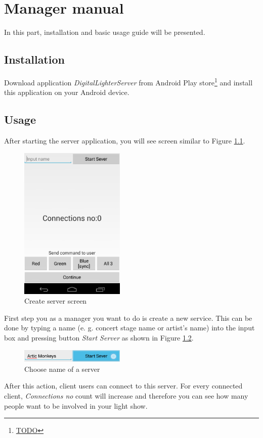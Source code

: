 \chapter{Manager manual}
In this part, installation and basic usage guide will be presented.
\section{Installation}
Download application \emph{DigitalLighterServer} from Android Play store\footnote{\url{TODO}} and install this application on your Android device.
\section{Usage}
After starting the server application, you will see screen similar to Figure \ref{fig:manual_server0}.
\begin{figure}[h]
	\centering
		\includegraphics[width=5cm]{appendix/server0.png}
	\caption{Create server screen}
	\label{fig:manual_server0}
\end{figure}

First step you as a manager you want to do is create a new service.
This can be done by typing a name (e. g. concert stage name or artist's name) into the input box and pressing button \emph{Start Server} as shown in Figure \ref{fig:manual_server1}.

\begin{figure}[h]
	\centering
		\includegraphics[width=5cm]{appendix/server2.png}
	\caption{Choose name of a server}
	\label{fig:manual_server1}
\end{figure}

After this action, client users can connect to this server.
For every connected client, \emph{Connections no} count will increase and therefore you can see how many people want to be involved in your light show.

